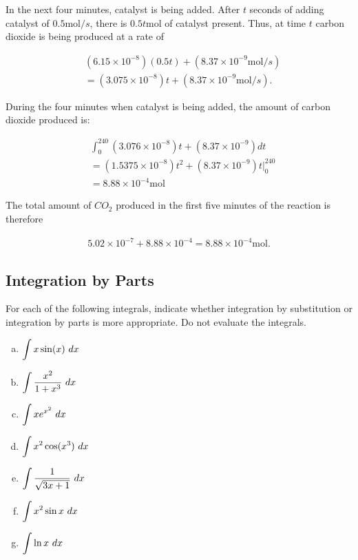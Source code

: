 \begin{enumerate}[1.]
\begin{multicols}{2}
\begin{Solution}
  In the next four minutes, catalyst is being added. After $t$ seconds
  of adding catalyst of $0.5\mbox{mol}/s$, there is $0.5t\mbox{mol}$
  of catalyst present. Thus, at time $t$ carbon dioxide is being
  produced at a rate of

  \begin{align*}
&    (6.15\times10^{-8})(0.5t)+(8.37\times 10^{-9}\mbox{mol}/s) \\ & = 
    (3.075\times10^{-8})t+(8.37\times 10^{-9}\mbox{mol}/s).
  \end{align*}

  During the four minutes when catalyst is being added, the amount of
  carbon dioxide produced is:

  \begin{align*}
&      \int_{0}^{240}(3.076\times10^{-8})t+(8.37\times 10^{-9})dt \\ 
& = \left.(1.5375\times10^{-8})t^{2}+(8.37\times 10^{-9})t\right. \Big |_{0}^{240} \\
  & =8.88\times10^{-4}\mbox{mol}
  \end{align*}

  The total amount of $CO_{2}$ produced in the first five minutes of
  the reaction is therefore

  \begin{align*}
    5.02\times 10^{-7}+8.88\times10^{-4}=8.88\times10^{-4}\mbox{mol}.
  \end{align*}
\end{Solution}

\end{multicols}

\hrulefill

\subsection*{Integration by Parts}

\begin{multicols}{2}


\item
  \begin{Question}
    For each of the following integrals, indicate whether integration
    by substitution or integration by parts is more appropriate.  Do
    not evaluate the integrals.

    \begin{enumerate}[(a)]
    \item $\displaystyle \int x \sin(x)~dx$
    \item $\displaystyle \int \frac{x^2}{1+x^3}~dx$
    \item $\displaystyle \int x e^{x^2}~dx$
    \item $\displaystyle \int x^2 \cos(x^3)~dx$
    \item $\displaystyle \int \frac{1}{\sqrt{3x+1}}~dx$
    \item $\displaystyle \int x^2 \sin x~dx$
    \item $\displaystyle \int \ln x~dx$
    \end{enumerate}
  \end{Question}


\end{multicols}
\end{enumerate}
